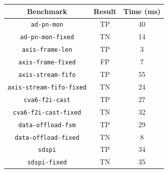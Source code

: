 \begin{tabular}{ccc}
    \toprule
    \textbf{Benchmark} & \textbf{Result} & \textbf{Time (ms)} \\
    \midrule
    \texttt{ad-pn-mon} & TP & 40 \\
    \texttt{ad-pn-mon-fixed} & TN & 14\\
    \texttt{axis-frame-len} & TP & 3 \\
    \texttt{axis-frame-fixed} & FP & 7 \\
    \texttt{axis-stream-fifo} & TP & 55 \\
    \texttt{axis-stream-fifo-fixed} & TN & 24 \\
    \texttt{cva6-f2i-cast} & TP & 27 \\
    \texttt{cva6-f2i-cast-fixed} & TN & 32 \\
    \texttt{data-offload-fsm} & TP & 29 \\
    \texttt{data-offload-fixed} & TN & 8 \\
    \texttt{sdspi} & TP & 34 \\
    \texttt{sdspi-fixed} & TN & 35 \\
    \bottomrule
\end{tabular}
